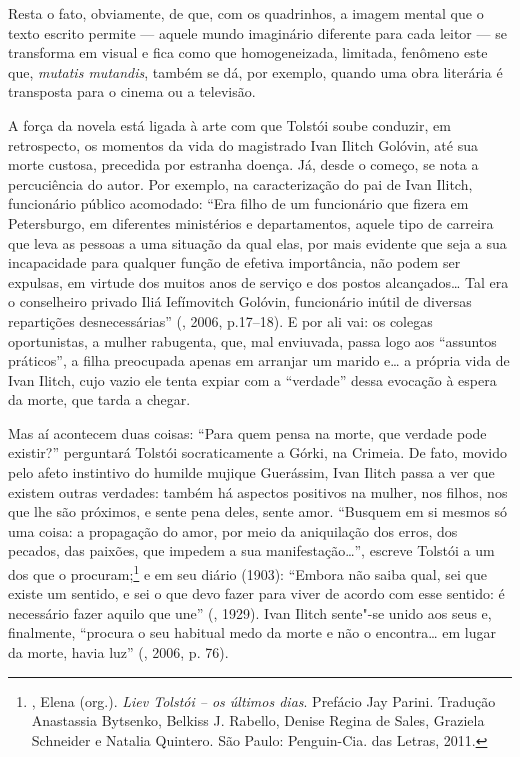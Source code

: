 Resta o fato, obviamente, de que, com os quadrinhos, a imagem
mental que o texto escrito permite --- aquele mundo imaginário
diferente para cada leitor --- se transforma em visual e fica
como que homogeneizada, limitada, fenômeno este que, \emph{mutatis
mutandis}, também se dá, por exemplo, quando uma obra literária é
transposta para o cinema ou a televisão.

A força da novela está ligada à arte com que
Tolstói soube conduzir, em retrospecto, os momentos da vida do
magistrado Ivan Ilitch Golóvin, até sua morte custosa, precedida
por estranha doença. Já, desde o começo, se nota a percuciência
do autor. Por exemplo, na caracterização do pai de Ivan Ilitch,
funcionário público acomodado: ``Era filho de um funcionário que
fizera em Petersburgo, em
diferentes ministérios e departamentos, aquele tipo de
carreira que leva as pessoas a uma situação da qual elas,
por mais evidente que seja a sua incapacidade para qualquer
função de efetiva importância, não podem ser expulsas, em
virtude dos muitos anos de serviço e dos postos alcançados\ldots{}
Tal era o conselheiro privado Iliá Iefímovitch Golóvin,
funcionário inútil de diversas repartições  desnecessárias''
(, 2006, p.17--18). E por ali vai: os colegas
oportunistas, a mulher rabugenta, que, mal enviuvada, passa
logo aos ``assuntos práticos'', a filha preocupada apenas em
arranjar um marido e\ldots{} a própria vida de Ivan Ilitch,
cujo vazio ele tenta expiar com a ``verdade'' dessa evocação
à espera da morte, que tarda a chegar. 

Mas aí acontecem duas coisas: ``Para quem pensa na morte, que
verdade pode existir?'' perguntará Tolstói socraticamente a
Górki, na Crimeia. De fato, movido pelo afeto instintivo do
humilde mujique Guerássim, Ivan Ilitch passa a ver que
existem outras verdades: também há aspectos positivos na
mulher, nos filhos, nos que lhe são próximos, e sente pena
deles, sente amor. ``Busquem em si mesmos só uma coisa: a
propagação do amor, por meio da aniquilação dos erros, dos
pecados, das paixões, que impedem a sua manifestação\ldots{}'',
escreve Tolstói a um dos que o
procuram;\footnote{, Elena (org.). \emph{Liev
Tolstói -- os últimos dias}. Prefácio Jay Parini. Tradução
Anastassia Bytsenko, Belkiss J. Rabello, Denise Regina de
Sales, Graziela Schneider e Natalia Quintero. São Paulo:
Penguin-Cia. das Letras, 2011.} e em seu diário (1903): ``Embora não saiba qual, sei que existe um sentido, e sei o que
devo fazer para viver de acordo com esse sentido: é necessário
fazer aquilo que une'' (, 1929). Ivan Ilitch
sente"-se unido aos seus e, finalmente, ``procura o seu habitual
medo da morte e não o encontra\ldots{} em lugar da morte, havia
luz'' (, 2006, p. 76).


